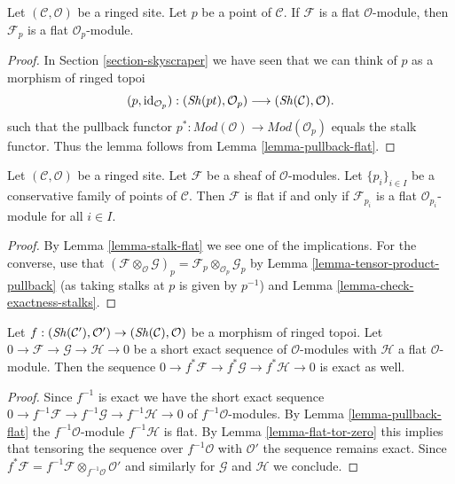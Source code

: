 \begin{lemma}
\label{lemma-stalk-flat}
Let $(\mathcal{C}, \mathcal{O})$ be a ringed site.
Let $p$ be a point of $\mathcal{C}$.
If $\mathcal{F}$ is a flat $\mathcal{O}$-module, then
$\mathcal{F}_p$ is a flat $\mathcal{O}_p$-module.
\end{lemma}

\begin{proof}
In Section \ref{section-skyscraper} we have seen
that we can think of $p$ as a morphism of ringed topoi
$$
(p, \text{id}_{\mathcal{O}_p}) :
(\mathop{\mathit{Sh}}\nolimits(pt), \mathcal{O}_p)
\longrightarrow
(\mathop{\mathit{Sh}}\nolimits(\mathcal{C}), \mathcal{O}).
$$
such that the pullback functor
$p^* : \textit{Mod}(\mathcal{O}) \to \textit{Mod}(\mathcal{O}_p)$
equals the stalk functor. Thus the lemma follows from
Lemma \ref{lemma-pullback-flat}.
\end{proof}

\begin{lemma}
\label{lemma-check-flat-stalks}
Let $(\mathcal{C}, \mathcal{O})$ be a ringed site.
Let $\mathcal{F}$ be a sheaf of $\mathcal{O}$-modules.
Let $\{p_i\}_{i \in I}$ be a conservative family of points of $\mathcal{C}$.
Then $\mathcal{F}$ is flat if and only if $\mathcal{F}_{p_i}$ is
a flat $\mathcal{O}_{p_i}$-module for all $i \in I$.
\end{lemma}

\begin{proof}
By
Lemma \ref{lemma-stalk-flat}
we see one of the implications.
For the converse, use that
$(\mathcal{F} \otimes_\mathcal{O} \mathcal{G})_p =
\mathcal{F}_p \otimes_{\mathcal{O}_p} \mathcal{G}_p$
by
Lemma \ref{lemma-tensor-product-pullback} (as taking stalks at $p$
is given by $p^{-1}$) and
Lemma \ref{lemma-check-exactness-stalks}.
\end{proof}

\begin{lemma}
\label{lemma-pullback-ses}
Let
$f : (\mathop{\mathit{Sh}}\nolimits(\mathcal{C}'), \mathcal{O}') \to (\mathop{\mathit{Sh}}\nolimits(\mathcal{C}), \mathcal{O})$
be a morphism of ringed topoi. Let
$0 \to \mathcal{F} \to \mathcal{G} \to \mathcal{H} \to 0$
be a short exact sequence of $\mathcal{O}$-modules with $\mathcal{H}$
a flat $\mathcal{O}$-module. Then the sequence
$0 \to f^*\mathcal{F} \to f^*\mathcal{G} \to f^*\mathcal{H} \to 0$
is exact as well.
\end{lemma}

\begin{proof}
Since $f^{-1}$ is exact we have the short exact sequence
$0 \to f^{-1}\mathcal{F} \to f^{-1}\mathcal{G} \to f^{-1}\mathcal{H} \to 0$
of $f^{-1}\mathcal{O}$-modules. By
Lemma \ref{lemma-pullback-flat}
the $f^{-1}\mathcal{O}$-module $f^{-1}\mathcal{H}$ is flat. By
Lemma \ref{lemma-flat-tor-zero} this implies that tensoring the sequence
over $f^{-1}\mathcal{O}$ with $\mathcal{O}'$ the sequence
remains exact. Since
$f^*\mathcal{F} = f^{-1}\mathcal{F} \otimes_{f^{-1}\mathcal{O}} \mathcal{O}'$
and similarly for $\mathcal{G}$ and $\mathcal{H}$ we conclude.
\end{proof}





